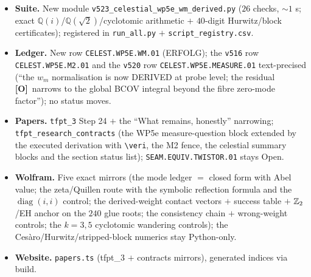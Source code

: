 \documentclass[11pt]{article}
\providecommand{\mO}{\textbf{[O]}}\providecommand{\mX}{\textbf{[X]}}
\providecommand{\vref}[1]{\texttt{#1}}
\providecommand{\Q}{\mathbb{Q}}
\begin{document}
\begin{itemize}[leftmargin=1.5em]
\item \textbf{Suite.} New module \texttt{v523\_celestial\_wp5e\_wm\_derived.py} ($26$ checks,
$\sim1$ s; exact $\Q(i)$/$\Q(\sqrt2)$/cyclotomic arithmetic $+$ $40$-digit Hurwitz/block
certificates); registered in \texttt{run\_all.py} $+$ \texttt{script\_registry.csv}.
\item \textbf{Ledger.} New row \texttt{CELEST.WP5E.WM.01} (ERFOLG); the \vref{v516} row
\texttt{CELEST.WP5E.M2.01} and the \vref{v520} row \texttt{CELEST.WP5E.MEASURE.01}
text-precised (``the $w_m$ normalisation is now DERIVED at probe level; the residual \mO\
narrows to the global BCOV integral beyond the fibre zero-mode factor''); no status moves.
\item \textbf{Papers.} \texttt{tfpt\_3} Step 24 $+$ the ``What remains, honestly'' narrowing;
\texttt{tfpt\_research\_contracts} (the WP5e measure-question block extended by the executed
derivation with \texttt{\textbackslash veri}, the M2 fence, the celestial summary blocks and
the section status list); \texttt{SEAM.EQUIV.TWISTOR.01} stays Open.
\item \textbf{Wolfram.} Five exact mirrors (the mode ledger $=$ closed form with Abel value;
the zeta/Quillen route with the symbolic reflection formula and the $\operatorname{diag}(i,i)$
control; the derived-weight contact vectors $+$ success table $+$ $\mathbb{Z}_2$/EH anchor on the
$240$ glue roots; the consistency chain $+$ wrong-weight controls; the $k=3,5$ cyclotomic
wandering controls); the Ces\`aro/Hurwitz/stripped-block numerics stay Python-only.
\item \textbf{Website.} \texttt{papers.ts} (tfpt\_3 $+$ contracts mirrors), generated indices
via build.
\end{itemize}
\end{document}
